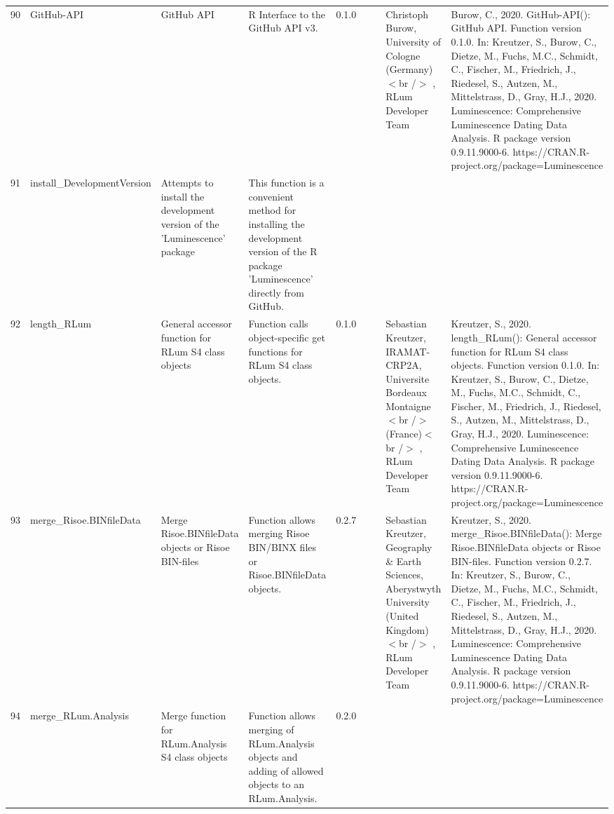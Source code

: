 \begin{table}[ht]
\begin{tabular}{rllllllll}
 \\ 
  90 & GitHub-API & GitHub API & R Interface to the GitHub API v3. & 0.1.0
 &  &  & Christoph Burow, University of Cologne (Germany)$<$br /$>$ , RLum Developer Team & Burow, C., 2020. GitHub-API(): GitHub API. Function version 0.1.0. In: Kreutzer, S., Burow, C., Dietze, M., Fuchs, M.C., Schmidt, C., Fischer, M., Friedrich, J., Riedesel, S., Autzen, M., Mittelstrass, D., Gray, H.J., 2020. Luminescence: Comprehensive Luminescence Dating Data Analysis. R package version 0.9.11.9000-6. https://CRAN.R-project.org/package=Luminescence
 \\ 
  91 & install\_DevelopmentVersion & Attempts to install the development version of the 'Luminescence' package & This function is a convenient method for installing the development version of the R package 'Luminescence' directly from GitHub. &  &  &  &  &  \\ 
  92 & length\_RLum & General accessor function for RLum S4 class objects & Function calls object-specific get functions for RLum S4 class objects. & 0.1.0
 &  &  & Sebastian Kreutzer, IRAMAT-CRP2A, Universite Bordeaux Montaigne$<$br /$>$ (France)$<$br /$>$ , RLum Developer Team & Kreutzer, S., 2020. length\_RLum(): General accessor function for RLum S4 class objects. Function version 0.1.0. In: Kreutzer, S., Burow, C., Dietze, M., Fuchs, M.C., Schmidt, C., Fischer, M., Friedrich, J., Riedesel, S., Autzen, M., Mittelstrass, D., Gray, H.J., 2020. Luminescence: Comprehensive Luminescence Dating Data Analysis. R package version 0.9.11.9000-6. https://CRAN.R-project.org/package=Luminescence
 \\ 
  93 & merge\_Risoe.BINfileData & Merge Risoe.BINfileData objects or Risoe BIN-files & Function allows merging Risoe BIN/BINX files or Risoe.BINfileData objects. & 0.2.7
 &  &  & Sebastian Kreutzer, Geography \& Earth Sciences, Aberystwyth University (United Kingdom)$<$br /$>$ , RLum Developer Team & Kreutzer, S., 2020. merge\_Risoe.BINfileData(): Merge Risoe.BINfileData objects or Risoe BIN-files. Function version 0.2.7. In: Kreutzer, S., Burow, C., Dietze, M., Fuchs, M.C., Schmidt, C., Fischer, M., Friedrich, J., Riedesel, S., Autzen, M., Mittelstrass, D., Gray, H.J., 2020. Luminescence: Comprehensive Luminescence Dating Data Analysis. R package version 0.9.11.9000-6. https://CRAN.R-project.org/package=Luminescence
 \\ 
  94 & merge\_RLum.Analysis & Merge function for RLum.Analysis S4 class objects & Function allows merging of RLum.Analysis objects and adding of allowed objects to an RLum.Analysis. & 0.2.0

\end{tabular}
\end{table}
